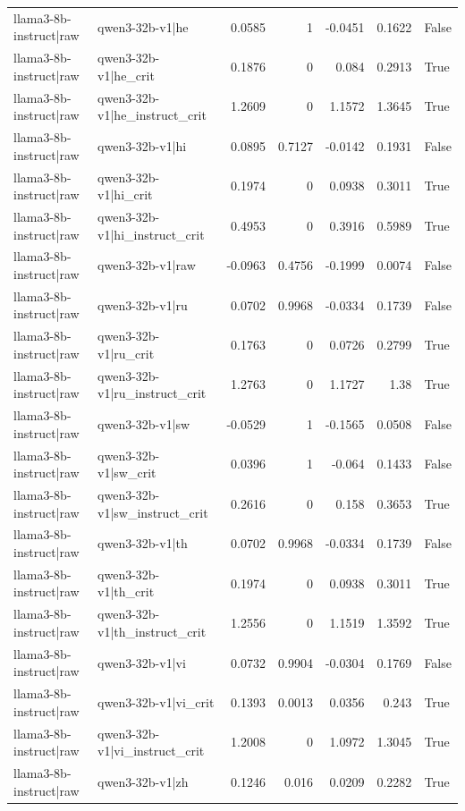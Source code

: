 \begin{table}
\begin{tabular}{l l r r r r l}
llama3-8b-instruct|raw & qwen3-32b-v1|he & 0.0585 & 1 & -0.0451 & 0.1622 & False \\
llama3-8b-instruct|raw & qwen3-32b-v1|he_crit & 0.1876 & 0 & 0.084 & 0.2913 & True \\
llama3-8b-instruct|raw & qwen3-32b-v1|he_instruct_crit & 1.2609 & 0 & 1.1572 & 1.3645 & True \\
llama3-8b-instruct|raw & qwen3-32b-v1|hi & 0.0895 & 0.7127 & -0.0142 & 0.1931 & False \\
llama3-8b-instruct|raw & qwen3-32b-v1|hi_crit & 0.1974 & 0 & 0.0938 & 0.3011 & True \\
llama3-8b-instruct|raw & qwen3-32b-v1|hi_instruct_crit & 0.4953 & 0 & 0.3916 & 0.5989 & True \\
llama3-8b-instruct|raw & qwen3-32b-v1|raw & -0.0963 & 0.4756 & -0.1999 & 0.0074 & False \\
llama3-8b-instruct|raw & qwen3-32b-v1|ru & 0.0702 & 0.9968 & -0.0334 & 0.1739 & False \\
llama3-8b-instruct|raw & qwen3-32b-v1|ru_crit & 0.1763 & 0 & 0.0726 & 0.2799 & True \\
llama3-8b-instruct|raw & qwen3-32b-v1|ru_instruct_crit & 1.2763 & 0 & 1.1727 & 1.38 & True \\
llama3-8b-instruct|raw & qwen3-32b-v1|sw & -0.0529 & 1 & -0.1565 & 0.0508 & False \\
llama3-8b-instruct|raw & qwen3-32b-v1|sw_crit & 0.0396 & 1 & -0.064 & 0.1433 & False \\
llama3-8b-instruct|raw & qwen3-32b-v1|sw_instruct_crit & 0.2616 & 0 & 0.158 & 0.3653 & True \\
llama3-8b-instruct|raw & qwen3-32b-v1|th & 0.0702 & 0.9968 & -0.0334 & 0.1739 & False \\
llama3-8b-instruct|raw & qwen3-32b-v1|th_crit & 0.1974 & 0 & 0.0938 & 0.3011 & True \\
llama3-8b-instruct|raw & qwen3-32b-v1|th_instruct_crit & 1.2556 & 0 & 1.1519 & 1.3592 & True \\
llama3-8b-instruct|raw & qwen3-32b-v1|vi & 0.0732 & 0.9904 & -0.0304 & 0.1769 & False \\
llama3-8b-instruct|raw & qwen3-32b-v1|vi_crit & 0.1393 & 0.0013 & 0.0356 & 0.243 & True \\
llama3-8b-instruct|raw & qwen3-32b-v1|vi_instruct_crit & 1.2008 & 0 & 1.0972 & 1.3045 & True \\
llama3-8b-instruct|raw & qwen3-32b-v1|zh & 0.1246 & 0.016 & 0.0209 & 0.2282 & True \\

\end{tabular}
\end{table}
